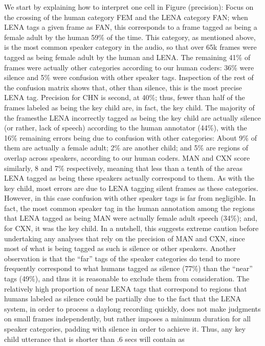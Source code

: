\documentclass[english,floatsintext,man]{apa6}
\begin{document}
We start by explaining how to interpret one cell in Figure (precision):
Focus on the crossing of the human category FEM and the LENA category
FAN; when LENA tags a given frame as FAN, this corresponds to a frame
tagged as being a female adult by the human 59\% of the time. This
category, as mentioned above, is the most common speaker category in the
audio, so that over 65k frames were tagged as being female adult by the
human and LENA. The remaining 41\% of frames were actually other
categories according to our human coders: 36\% were silence and 5\% were
confusion with other speaker tags. Inspection of the rest of the
confusion matrix shows that, other than silence, this is the most
precise LENA tag. Precision for CHN is second, at 40\%; thus, fewer than
half of the frames labeled as being the key child are, in fact, the key
child. The majority of the framesthe LENA incorrectly tagged as being
the key child are actually silence (or rather, lack of speech) according
to the human annotator (44\%), with the 16\% remaining errors being due
to confusion with other categories: About 9\% of them are actually a
female adult; 2\% are another child; and 5\% are regions of overlap
across speakers, according to our human coders. MAN and CXN score
similarly, 8 and 7\% respectively, meaning that less than a tenth of the
areas LENA tagged as being these speakers actually correspond to them.
As with the key child, most errors are due to LENA tagging silent frames
as these categories. However, in this case confusion with other speaker
tags is far from negligible. In fact, the most common speaker tag in the
human annotation among the regions that LENA tagged as being MAN were
actually female adult speech (34\%); and, for CXN, it was the key child.
In a nutshell, this suggests extreme caution before undertaking any
analyses that rely on the precision of MAN and CXN, since most of what
is being tagged as such is silence or other speakers. Another
observation is that the \enquote{far} tags of the speaker categories do
tend to more frequently correspond to what humans tagged as silence
(77\%) than the \enquote{near} tags (49\%), and thus it is reasonable to
exclude them from consideration. The relatively high proportion of near
LENA tags that correspond to regions that humans labeled as silence
could be partially due to the fact that the LENA system, in order to
process a daylong recording quickly, does not make judgments on small
frames independently, but rather imposes a minimum duration for all
speaker categories, padding with silence in order to achieve it. Thus,
any key child utterance that is shorter than .6 secs will contain as
\end{document}
